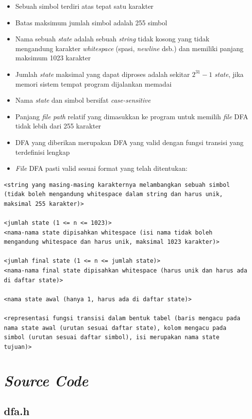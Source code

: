 \documentclass[a4paper,titlepage]{article}
\begin{document}
		\begin{itemize}
			\item Sebuah simbol terdiri atas tepat satu karakter
			\item Batas maksimum jumlah simbol adalah 255 simbol
			\item Nama sebuah \textit{state} adalah sebuah \textit{string} tidak kosong yang tidak mengandung karakter \textit{whitespace} (spasi, \textit{newline} dsb.) dan memiliki panjang maksimum 1023 karakter
			\item Jumlah \textit{state} maksimal yang dapat diproses adalah sekitar $2^{31}-1$ \textit{state}, jika memori sistem tempat program dijalankan memadai
			\item Nama \textit{state} dan simbol bersifat \textit{case-sensitive}
			\item Panjang \textit{file path} relatif yang dimasukkan ke program untuk memilih \textit{file} DFA tidak lebih dari 255 karakter
			\item DFA yang diberikan merupakan DFA yang valid dengan fungsi transisi yang terdefinisi lengkap
			\item \textit{File} DFA pasti valid sesuai format yang telah ditentukan:
		\end{itemize}

		\begin{lstlisting}
<string yang masing-masing karakternya melambangkan sebuah simbol (tidak boleh mengandung whitespace dalam string dan harus unik, maksimal 255 karakter)>

<jumlah state (1 <= n <= 1023)>
<nama-nama state dipisahkan whitespace (isi nama tidak boleh mengandung whitespace dan harus unik, maksimal 1023 karakter)>

<jumlah final state (1 <= n <= jumlah state)>
<nama-nama final state dipisahkan whitespace (harus unik dan harus ada di daftar state)>

<nama state awal (hanya 1, harus ada di daftar state)>

<representasi fungsi transisi dalam bentuk tabel (baris mengacu pada nama state awal (urutan sesuai daftar state), kolom mengacu pada simbol (urutan sesuai daftar simbol), isi merupakan nama state tujuan)>
		\end{lstlisting}

	\section{\textit{Source Code}}

		\subsection{dfa.h}
			
\end{document}
